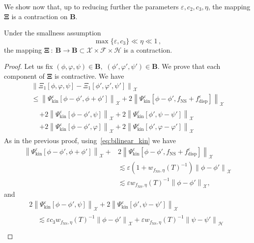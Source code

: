 \documentclass[AHL,Unicode,longabstracts,published]{cedram}
\newcommand{\ns}{\mathrm{NS}}
\newcommand{\kin}{\mathrm{kin}}
\newcommand{\disp}{\mathrm{disp}}
\newcommand{\FFF}{\mathscr{F}}
\newcommand{\HHH}{\mathscr{H}}
\newcommand{\GGG}{\mathscr{X}}
\newcommand{\SSSs}{\HHH}
\newcommand{\SSSl}{\GGG}
\newcommand{\SSSm}{\FFF}
\renewcommand*\le{\leqslant}
\newcommand*\eps{{\varepsilon}}
\begin{document}
We show now that, up to reducing further the parameters $\eps,c_2,c_3,\eta$, the mapping $\bm{\Xi}$ is a contraction on $\bm{B}$.

\begin{prop}
Under the smallness assumption
\[
\max\{ \eps, c_3 \} \ll \eta \ll 1\,,
\]
the mapping $\bm{\Xi}\::\:\bm{B} \to \bm{B} \subset \SSSl\times \SSSm \times \SSSs$ is a contraction.
\end{prop}

\begin{proof}
Let us fix $(\phi,\varphi,\psi) \in \bm{B},$ $(\phi',\varphi',\psi') \in \bm{B}$. We prove that each component of $\bm{\Xi}$ is contractive. We have
\begin{multline*}
\left\| \Xi_1[\phi, \varphi, \psi]  - \Xi_1\left[\phi', \varphi', \psi'\right] \right\|_{ \SSSl } \\
\le  \left\| \Psi^\eps_\kin\left[\phi - \phi', \phi + \phi'\right] \right\|_{\SSSl} + 2 \left\| \Psi^\eps_\kin\left[\phi - \phi', f_\ns + f^\eps_\disp\right] \right\|_{ \SSSl } \\
\begin{aligned}
& + 2 \left\| \Psi^\eps_\kin\left[\phi - \phi', \psi\right] \right\|_{ \SSSl } + 2 \left\| \Psi^\eps_\kin\left[\phi', \psi - \psi'\right] \right\|_{ \SSSl } \\
& + 2 \left\| \Psi^\eps_\kin\left[\phi - \phi', \varphi\right] \right\|_{ \SSSl } + 2 \left\| \Psi^\eps_\kin\left[\phi', \varphi - \varphi'\right]\right\|_{ \SSSl }
\end{aligned}
\end{multline*}
As in the previous proof, using~\eqref{eq:bilinear_kin} we have
\begin{align*}
\left\| \Psi^\eps_\kin\left[\phi - \phi', \phi + \phi'\right] \right\|_{\SSSl}  +& 2 \left\| \Psi^\eps_\kin\left[\phi - \phi', f_\ns + f^\eps_\disp\right] \right\|_{ \SSSl } \\
& \lesssim \eps \left(1 + w_{f_\ns, \eta}(T)^{-1} \right) \left\| \phi - \phi' \right\|_{ \SSSl } \\
& \lesssim \eps w_{f_\ns, \eta}(T)^{-1} \left\| \phi - \phi' \right\|_{ \SSSl },
\end{align*}
and
\begin{multline*}
2 \left\| \Psi^\eps_\kin\left[\phi - \phi', \psi\right] \right\|_{ \SSSl } + 2 \left\| \Psi^\eps_\kin\left[\phi', \psi - \psi'\right] \right\|_{ \SSSl } \\
\begin{aligned}
&\lesssim \eps c_3 w_{f_\ns, \eta}(T)^{-1} \left\| \phi - \phi' \right\|_{ \SSSl } + \eps w_{f_\ns, \eta}(T)^{-1} \left\| \psi - \psi' \right\|_{ \SSSs } \\

\end{aligned}
\end{multline*}
\end{proof}
\end{document}
